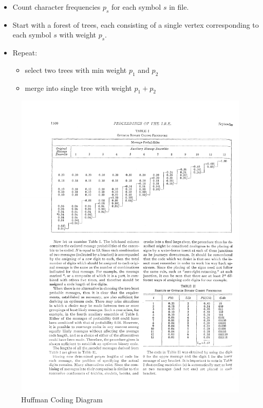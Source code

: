 \documentclass{article}
\begin{document}
\begin{itemize}
    \item Count character frequencies $p_{s}$ for each symbol $s$ in file.
    \item Start with a forest of trees, each consisting of a single vertex corresponding to each symbol $s$ with weight $p_{s}$.
    \item Repeat:
        \begin{itemize}
            \item select two trees with min weight $p_{1}$ and $p_{2}$
            \item merge into single tree with weight $p_{1}+p_{2}$
        \end{itemize}
\end{itemize}

\begin{figure}[htbp]
    \center
    \includegraphics[scale=1.35]{img/C3_figure_1}
    \caption{Huffman Coding Diagram \cite{Huffman_1952}}
\end{figure}
\end{document}
